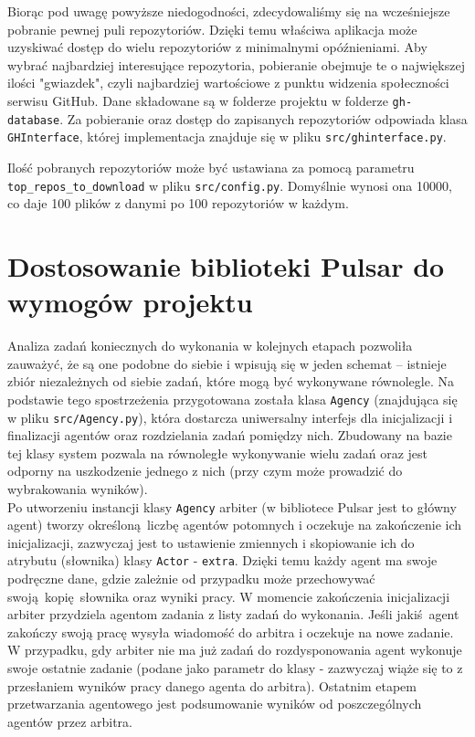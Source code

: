 \documentclass[12pt, oneside, final]{report}
\begin{document}
Biorąc pod uwagę powyższe niedogodności, zdecydowaliśmy się na wcześniejsze pobranie pewnej puli repozytoriów. Dzięki temu właściwa aplikacja może uzyskiwać dostęp do wielu repozytoriów z minimalnymi opóźnieniami. Aby wybrać najbardziej interesujące repozytoria, pobieranie obejmuje te o największej ilości "gwiazdek", czyli najbardziej wartościowe z punktu widzenia społeczności serwisu GitHub. Dane składowane są w folderze projektu w folderze \texttt{gh-database}. Za pobieranie oraz dostęp do zapisanych repozytoriów odpowiada klasa \texttt{GHInterface}, której implementacja znajduje się w pliku \texttt{src/ghinterface.py}.

Ilość pobranych repozytoriów może być ustawiana za pomocą parametru \texttt{top\_repos\_to\_down\-load} w pliku \texttt{src/config.py}. Domyślnie wynosi ona 10000, co daje 100 plików z danymi po 100 repozytoriów w każdym.

\section*{Dostosowanie biblioteki Pulsar do wymogów projektu}
Analiza zadań koniecznych do wykonania w kolejnych etapach pozwoliła zauważyć, że są one podobne do siebie i wpisują się w jeden schemat -- istnieje zbiór niezależnych od siebie zadań, które mogą być wykonywane równolegle. Na podstawie tego spostrzeżenia przygotowana została klasa \texttt{Agency} (znajdująca się w pliku \texttt{src/Agency.py}), która dostarcza uniwersalny interfejs dla inicjalizacji i finalizacji agentów oraz rozdzielania zadań pomiędzy nich. Zbudowany na bazie tej klasy system pozwala na równoległe wykonywanie wielu zadań oraz jest odporny na uszkodzenie jednego z nich (przy czym może prowadzić do wybrakowania wyników).
\\
Po utworzeniu instancji klasy \texttt{Agency} arbiter (w bibliotece Pulsar jest to główny agent) tworzy określoną liczbę agentów potomnych i oczekuje na zakończenie ich inicjalizacji, zazwyczaj jest to ustawienie zmiennych i skopiowanie ich do atrybutu (słownika) klasy \texttt{Actor} - \texttt{extra}. Dzięki temu każdy agent ma swoje podręczne dane, gdzie zależnie od przypadku może przechowywać swoją kopię słownika oraz wyniki pracy. W momencie zakończenia inicjalizacji arbiter przydziela agentom zadania z listy zadań do wykonania. Jeśli jakiś agent zakończy swoją pracę wysyła wiadomość do arbitra i oczekuje na nowe zadanie. W przypadku, gdy arbiter nie ma już zadań do rozdysponowania agent wykonuje swoje ostatnie zadanie (podane jako parametr do klasy - zazwyczaj wiąże się to z przesłaniem wyników pracy danego agenta do arbitra). Ostatnim etapem przetwarzania agentowego jest podsumowanie wyników od poszczególnych agentów przez arbitra.
\end{document}
